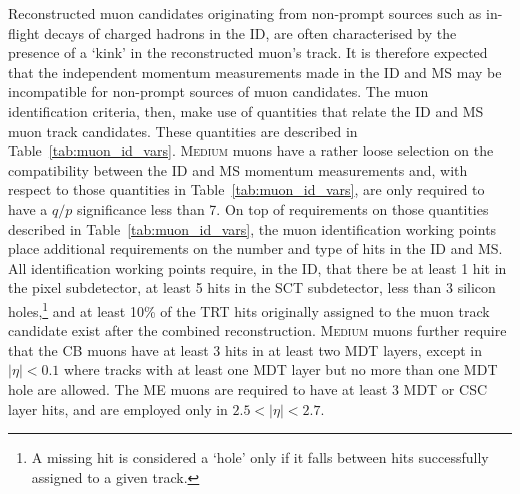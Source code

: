 Reconstructed muon candidates originating from non-prompt sources such
as in-flight decays of charged hadrons in the ID, are often characterised by the
presence of a `kink' in the reconstructed muon's track. It is therefore
expected that the independent momentum measurements made in the ID and MS may
be incompatible for non-prompt sources of muon candidates.
The muon identification criteria, then, make use of quantities
that relate the ID and MS muon track candidates.
These quantities are described in Table~\ref{tab:muon_id_vars}.
\textsc{Medium} muons have a rather loose selection on the compatibility between
the ID and MS momentum measurements and, with respect to those quantities in Table~\ref{tab:muon_id_vars},
are only required to have a $q/p$ significance less than 7.
On top of requirements on those quantities described in Table~\ref{tab:muon_id_vars},
the muon identification working points place
additional requirements on the number and type of hits in the ID and MS.
All identification working points require, in the ID, that there be at least 1 hit
in the pixel subdetector, at least 5 hits in the SCT subdetector, less
than 3 silicon holes,\footnote{A missing hit is considered a `hole' only
if it falls between hits successfully assigned to a given track.}
and at least 10\% of the TRT hits originally assigned to the muon track candidate exist
after the combined reconstruction.
\textsc{Medium} muons further require that the CB muons have at least 3 hits in at least
two MDT layers, except in $\lvert \eta \rvert < 0.1$ where tracks with at least one MDT layer but no more
than one MDT hole are allowed. The ME  muons are required to have at least
3 MDT or CSC layer hits, and are employed only in $2.5 < \lvert \eta \rvert < 2.7$.

